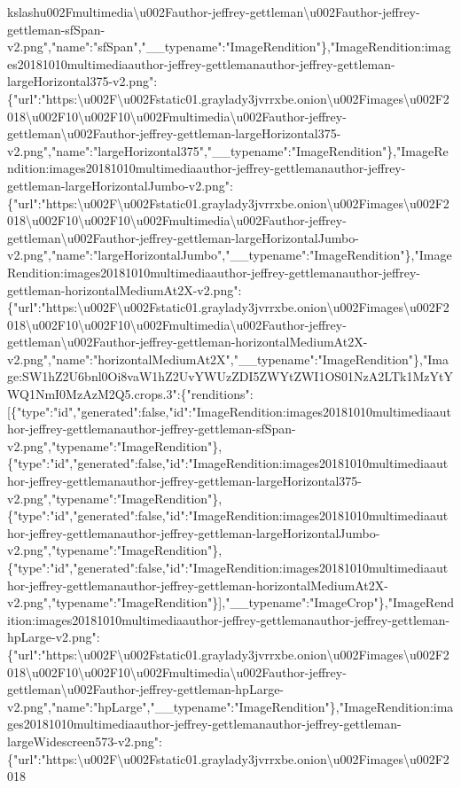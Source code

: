kslash{}u002Fmultimedia\textbackslash{}u002Fauthor-jeffrey-gettleman\textbackslash{}u002Fauthor-jeffrey-gettleman-sfSpan-v2.png","name":"sfSpan","\_\_typename":"ImageRendition"\},"ImageRendition:images20181010multimediaauthor-jeffrey-gettlemanauthor-jeffrey-gettleman-largeHorizontal375-v2.png":\{"url":"https:\textbackslash{}u002F\textbackslash{}u002Fstatic01.graylady3jvrrxbe.onion\textbackslash{}u002Fimages\textbackslash{}u002F2018\textbackslash{}u002F10\textbackslash{}u002F10\textbackslash{}u002Fmultimedia\textbackslash{}u002Fauthor-jeffrey-gettleman\textbackslash{}u002Fauthor-jeffrey-gettleman-largeHorizontal375-v2.png","name":"largeHorizontal375","\_\_typename":"ImageRendition"\},"ImageRendition:images20181010multimediaauthor-jeffrey-gettlemanauthor-jeffrey-gettleman-largeHorizontalJumbo-v2.png":\{"url":"https:\textbackslash{}u002F\textbackslash{}u002Fstatic01.graylady3jvrrxbe.onion\textbackslash{}u002Fimages\textbackslash{}u002F2018\textbackslash{}u002F10\textbackslash{}u002F10\textbackslash{}u002Fmultimedia\textbackslash{}u002Fauthor-jeffrey-gettleman\textbackslash{}u002Fauthor-jeffrey-gettleman-largeHorizontalJumbo-v2.png","name":"largeHorizontalJumbo","\_\_typename":"ImageRendition"\},"ImageRendition:images20181010multimediaauthor-jeffrey-gettlemanauthor-jeffrey-gettleman-horizontalMediumAt2X-v2.png":\{"url":"https:\textbackslash{}u002F\textbackslash{}u002Fstatic01.graylady3jvrrxbe.onion\textbackslash{}u002Fimages\textbackslash{}u002F2018\textbackslash{}u002F10\textbackslash{}u002F10\textbackslash{}u002Fmultimedia\textbackslash{}u002Fauthor-jeffrey-gettleman\textbackslash{}u002Fauthor-jeffrey-gettleman-horizontalMediumAt2X-v2.png","name":"horizontalMediumAt2X","\_\_typename":"ImageRendition"\},"Image:SW1hZ2U6bnl0Oi8vaW1hZ2UvYWUzZDI5ZWYtZWI1OS01NzA2LTk1MzYtYWQ1NmI0MzAzM2Q5.crops.3":\{"renditions":{[}\{"type":"id","generated":false,"id":"ImageRendition:images20181010multimediaauthor-jeffrey-gettlemanauthor-jeffrey-gettleman-sfSpan-v2.png","typename":"ImageRendition"\},\{"type":"id","generated":false,"id":"ImageRendition:images20181010multimediaauthor-jeffrey-gettlemanauthor-jeffrey-gettleman-largeHorizontal375-v2.png","typename":"ImageRendition"\},\{"type":"id","generated":false,"id":"ImageRendition:images20181010multimediaauthor-jeffrey-gettlemanauthor-jeffrey-gettleman-largeHorizontalJumbo-v2.png","typename":"ImageRendition"\},\{"type":"id","generated":false,"id":"ImageRendition:images20181010multimediaauthor-jeffrey-gettlemanauthor-jeffrey-gettleman-horizontalMediumAt2X-v2.png","typename":"ImageRendition"\}{]},"\_\_typename":"ImageCrop"\},"ImageRendition:images20181010multimediaauthor-jeffrey-gettlemanauthor-jeffrey-gettleman-hpLarge-v2.png":\{"url":"https:\textbackslash{}u002F\textbackslash{}u002Fstatic01.graylady3jvrrxbe.onion\textbackslash{}u002Fimages\textbackslash{}u002F2018\textbackslash{}u002F10\textbackslash{}u002F10\textbackslash{}u002Fmultimedia\textbackslash{}u002Fauthor-jeffrey-gettleman\textbackslash{}u002Fauthor-jeffrey-gettleman-hpLarge-v2.png","name":"hpLarge","\_\_typename":"ImageRendition"\},"ImageRendition:images20181010multimediaauthor-jeffrey-gettlemanauthor-jeffrey-gettleman-largeWidescreen573-v2.png":\{"url":"https:\textbackslash{}u002F\textbackslash{}u002Fstatic01.graylady3jvrrxbe.onion\textbackslash{}u002Fimages\textbackslash{}u002F2018\textba